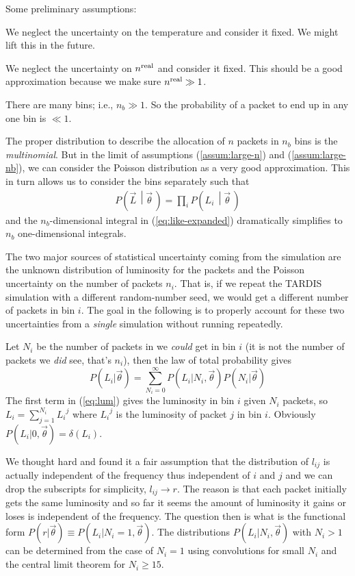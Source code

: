 \documentclass[a4,12pt]{article}
\newcommand{\given}[2]{\left(#1\, \middle| #2 \, \right)}
\newcommand{\Lumi}{\ensuremath{L_i}}
\newcommand{\real}{\ensuremath{{\rm real}}}
\newcommand{\vecL}{\ensuremath{\vec{L}}}
\newcommand{\vecth}{\ensuremath{{\vec{\theta}}}}
\def \refeq#1{(\ref{eq:#1})}
\newcommand{\tardis}{TARDIS}
\begin{document}
Some preliminary assumptions:
\begin{compactenum}[(a)]
  \item We neglect the uncertainty on the temperature and consider it
    fixed. We might lift this in the future.
  \item \label{assum:large-n} We neglect the uncertainty on $n^\real$ and consider it
    fixed. This should be a good approximation because we make sure
    $n^\real \gg 1$.
  \item \label{assum:large-nb} There are many bins; i.e., $n_b \gg 1$. So the probability of
    a packet to end up in any one bin is $\ll 1$.
\end{compactenum}
The proper distribution to describe the allocation of $n$ packets in
$n_b$ bins is the \emph{multinomial}. But in the limit of assumptions
(\ref{assum:large-n}) and (\ref{assum:large-nb}), we can consider the
Poisson distribution as a very good approximation. This in turn allows
us to consider the bins separately such that
\begin{align}
  \label{eq:factor-L}
  P\given{\vecL}{\vecth} = \prod_i P\given{L_i}{\vecth}
\end{align}
and the $n_b$-dimensional integral in \refeq{like-expanded}
dramatically simplifies to $n_b$ one-dimensional integrals.

The two major sources of statistical uncertainty coming from the
simulation are the unknown distribution of luminosity for the packets
and the Poisson uncertainty on the number of packets $n_i$. That is,
if we repeat the \tardis{} simulation with a different random-number
seed, we would get a different number of packets in bin $i$. The goal
in the following is to properly account for these two uncertainties
from a \emph{single} simulation without running repeatedly.

Let $N_i$ be the number of packets in we \emph{could} get in bin $i$
(it is not the number of packets we \emph{did} see, that's $n_i$),
then the law of total probability gives
\begin{equation}
  \label{eq:lum}
  P(\Lumi | \vecth) = \sum_{N_i=0}^{\infty} P(\Lumi | N_i, \vecth) P(N_i | \vecth)
\end{equation}
The first term in \refeq{lum} gives the luminosity in bin $i$ given
$N_i$ packets, so $\Lumi = \sum_{j=1}^{N_i} \Lumi^j$ where $\Lumi^j$ is
the luminosity of packet $j$ in bin $i$. Obviously $P(\Lumi | 0,
\vecth) = \delta(\Lumi)$.

We thought hard and found it a fair assumption that the distribution
of $l_{ij}$ is actually independent of the frequency thus independent
of $i$ and $j$ and we can drop the subscripts for simplicity, $l_{ij}
\to r$. The reason is that each packet initially gets the same
luminosity and so far it seems the amount of luminosity it gains or
loses is independent of the frequency. The question then is what is
the functional form $P(r | \vecth) \equiv P(\Lumi | N_i=1, \vecth)
$. The distributions $P(\Lumi | N_i, \vecth)$ with $N_i > 1$ can be
determined from the case of $N_i=1$ using convolutions for small $N_i$
and the central limit theorem for $N_i \ge 15$.
\end{document}
